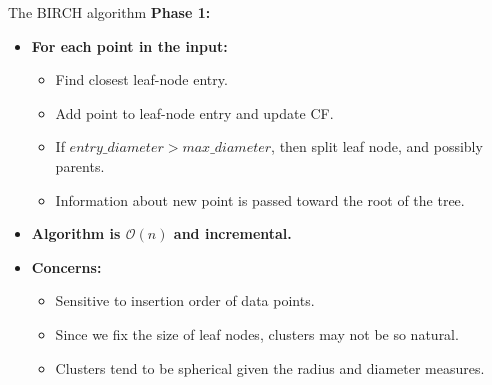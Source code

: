 \begin{frame}{The BIRCH algorithm}
	\textbf{Phase 1:}
	\begin{itemize}
		\item \textbf{For each point in the input:}
		      \begin{itemize}
			      \item Find closest leaf-node entry.
			      \item Add point to leaf-node entry and update CF.
			      \item If $entry\_diameter > max\_diameter$, then split leaf
			            node, and possibly parents.
			      \item Information about new point is passed toward the root of
			            the tree.
		      \end{itemize}
		\item \textbf{Algorithm is $\mathcal{O}(n)$ and incremental.}
		\item \textbf{Concerns:}
		      \begin{itemize}
			      \item Sensitive to insertion order of data points.
			      \item Since we fix the size of leaf nodes, clusters may not be
			            so natural.
			      \item Clusters tend to be spherical given the radius and
			            diameter measures.
		      \end{itemize}
	\end{itemize}
\end{frame}

